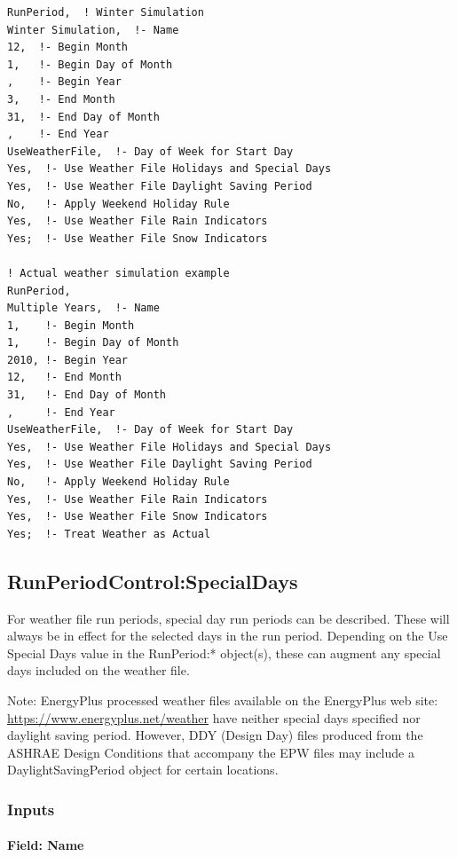 \begin{lstlisting}
RunPeriod,  ! Winter Simulation
Winter Simulation,  !- Name
12,  !- Begin Month
1,   !- Begin Day of Month
,    !- Begin Year
3,   !- End Month
31,  !- End Day of Month
,    !- End Year
UseWeatherFile,  !- Day of Week for Start Day
Yes,  !- Use Weather File Holidays and Special Days
Yes,  !- Use Weather File Daylight Saving Period
No,   !- Apply Weekend Holiday Rule
Yes,  !- Use Weather File Rain Indicators
Yes;  !- Use Weather File Snow Indicators

! Actual weather simulation example
RunPeriod,
Multiple Years,  !- Name
1,    !- Begin Month
1,    !- Begin Day of Month
2010, !- Begin Year
12,   !- End Month
31,   !- End Day of Month
,     !- End Year
UseWeatherFile,  !- Day of Week for Start Day
Yes,  !- Use Weather File Holidays and Special Days
Yes,  !- Use Weather File Daylight Saving Period
No,   !- Apply Weekend Holiday Rule
Yes,  !- Use Weather File Rain Indicators
Yes,  !- Use Weather File Snow Indicators
Yes;  !- Treat Weather as Actual
\end{lstlisting}

\subsection{RunPeriodControl:SpecialDays}\label{runperiodcontrolspecialdays}

For weather file run periods, special day run periods can be described. These will always be in effect for the selected days in the run period. Depending on the Use Special Days value in the RunPeriod:* object(s), these can augment any special days included on the weather file.

\begin{callout}
Note: EnergyPlus processed weather files available on the EnergyPlus web site: \url{https://www.energyplus.net/weather} have neither special days specified nor daylight saving period. However, DDY (Design Day) files produced from the ASHRAE Design Conditions that accompany the EPW files may include a DaylightSavingPeriod object for certain locations.
\end{callout}

\subsubsection{Inputs}\label{inputs-6-013}

\paragraph{Field: Name}\label{field-name-6-010}


